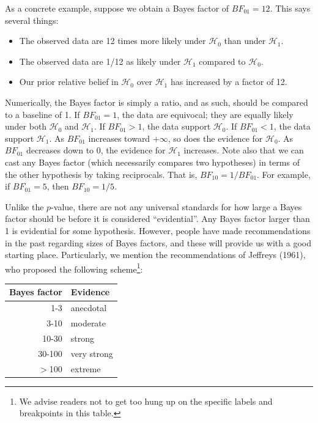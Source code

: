 \documentclass[english,,doc,floatsintext]{apa6}
\providecommand{\tightlist}{%
  \setlength{\itemsep}{0pt}\setlength{\parskip}{0pt}}
\let\rmarkdownfootnote\footnote%
\def\footnote{\protect\rmarkdownfootnote}
\begin{document}
As a concrete example, suppose we obtain a Bayes factor of \(BF_{01}=12\). This says several things:

\begin{itemize}
\tightlist
\item
  The observed data are 12 times more likely under \(\mathcal{H}_0\) than under \(\mathcal{H}_1\).
\item
  The observed data are 1/12 as likely under \(\mathcal{H}_1\) compared to \(\mathcal{H}_0\).
\item
  Our prior relative belief in \(\mathcal{H}_0\) over \(\mathcal{H}_1\) has increased by a factor of 12.
\end{itemize}

\noindent Numerically, the Bayes factor is simply a ratio, and as such, should be compared to a baseline of 1. If \(BF_{01}=1\), the data are equivocal; they are equally likely under both \(\mathcal{H}_0\) and \(\mathcal{H}_1\). If \(BF_{01}>1\), the data support \(\mathcal{H}_0\). If \(BF_{01}<1\), the data support \(\mathcal{H}_1\). As \(BF_{01}\) increases toward \(+\infty\), so does the evidence for \(\mathcal{H}_0\). As \(BF_{01}\) decreases down to 0, the evidence for \(\mathcal{H}_1\) increases. Note also that we can cast any Bayes factor (which necessarily compares two hypotheses) in terms of the other hypothesis by taking reciprocals. That is, \(BF_{10} = 1/BF_{01}\). For example, if \(BF_{01} = 5\), then \(BF_{10}=1/5\).

Unlike the \(p\)-value, there are not any universal standards for how large a Bayes factor should be before it is considered \enquote{evidential}. Any Bayes factor larger than 1 is evidential for some hypothesis. However, people have made recommendations in the past regarding sizes of Bayes factors, and these will provide us with a good starting place. Particularly, we mention the recommendations of Jeffreys (1961), who proposed the following scheme\footnote{We advise readers not to get too hung up on the specific labels and breakpoints in this table.}:

\begin{tabular}{rl}
Bayes factor & Evidence\\
\hline
1-3 & anecdotal\\
3-10 & moderate\\
10-30 & strong\\
30-100 & very strong\\
$>$100 & extreme\\
\end{tabular}
\end{document}
